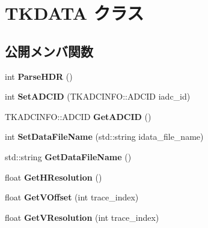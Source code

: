 \hypertarget{class_t_k_d_a_t_a}{}\section{T\+K\+D\+A\+TA クラス}
\label{class_t_k_d_a_t_a}
\subsection*{公開メンバ関数}
\begin{DoxyCompactItemize}
\item 
\mbox{\label{class_t_k_d_a_t_a_ad142911ef868b94bd2607ab4ca69f84d}} 
int {\bfseries Parse\+H\+DR} ()
\item 
\mbox{\label{class_t_k_d_a_t_a_a37d4aced7475c5c95058a3ec21fcd0f8}} 
int {\bfseries Set\+A\+D\+C\+ID} (T\+K\+A\+D\+C\+I\+N\+F\+O\+::\+A\+D\+C\+ID iadc\+\_\+id)
\item 
\mbox{\label{class_t_k_d_a_t_a_a55dfd4429439996f4911c7db2a3362fd}} 
T\+K\+A\+D\+C\+I\+N\+F\+O\+::\+A\+D\+C\+ID {\bfseries Get\+A\+D\+C\+ID} ()
\item 
\mbox{\label{class_t_k_d_a_t_a_ae63b673fda97ff6fef659f51fe40dbe8}} 
int {\bfseries Set\+Data\+File\+Name} (std\+::string idata\+\_\+file\+\_\+name)
\item 
\mbox{\label{class_t_k_d_a_t_a_a3f354a0eb29025867cbd1e3e27f8e41a}} 
std\+::string {\bfseries Get\+Data\+File\+Name} ()
\item 
\mbox{\label{class_t_k_d_a_t_a_a0f0c38948586490c1bfe1f820418c5ef}} 
float {\bfseries Get\+H\+Resolution} ()
\item 
\mbox{\label{class_t_k_d_a_t_a_a92cc4a576e976b454212f2f1dea7c3db}} 
float {\bfseries Get\+V\+Offset} (int trace\+\_\+index)
\item 
\mbox{\label{class_t_k_d_a_t_a_a7e63d262b65c7e35fbc80a9a93e92cf8}} 
float {\bfseries Get\+V\+Resolution} (int trace\+\_\+index)
\item 
\mbox{\label{class_t_k_d_a_t_a_ad9220ac722f2f717fcbbca0df45621b6}} 

\end{DoxyCompactItemize}
